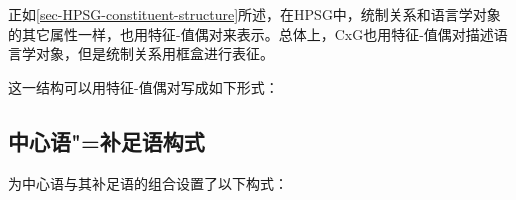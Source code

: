 正如\ref{sec-HPSG-constituent-structure}所述，在HPSG中，统制关系和语言学对象的其它属性一样，也用特征-值偶对来表示。总体上，CxG也用特征-值偶对描述语言学对象，但是统制关系用框盒进行表征\citep{KF99a,Goldberg2003a}。

\ea
\setlength{\fboxsep}{2mm}
\z
这一结构可以用特征-值偶对写成如下形式：

\ea
{}
\z

\subsection{中心语"=补足语构式}

 \citet{KF99a}为中心语与其补足语的组合设置了以下构式：

